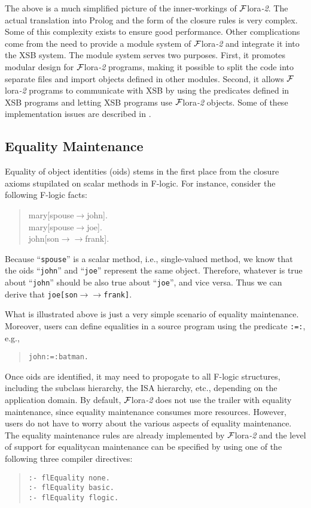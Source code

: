 \documentclass[11pt]{article}
\newcommand{\fd}{\ensuremath{{\rightarrow}}}                   %
\newcommand{\mvd}{\ensuremath{{\rightarrow\!\!\!\!\rightarrow}}}  %
\newcommand{\FLORA}{{\mbox{${\cal F}${\sc lora}\rm\emph{-2}}}\xspace}
\newcommand{\fl}{\mbox{F-logic}\xspace}
\begin{document}
The above is a much simplified picture of the inner-workings of \FLORA. The
actual translation into Prolog and the form of the closure rules is very
complex.  Some of this complexity exists to ensure good performance.  Other
complications come from the need to provide a module system of \FLORA and
integrate it into the XSB system.  The module system serves two purposes.
First, it promotes modular design for \FLORA programs, making it possible
to split the code into separate files and import objects defined in other
modules. Second, it allows \FLORA programs to communicate with XSB by using
the predicates defined in XSB programs and letting XSB programs use \FLORA
objects.  Some of these implementation issues are described in
\cite{guiz-flora-00}.


\subsection{Equality Maintenance}


Equality of object identities (oids) stems in the first place from the
closure axioms stupilated on scalar methods in \fl. For instance, consider
the following \fl facts:
\begin{quote}
mary[spouse{\fd}john]. \\
mary[spouse{\fd}joe]. \\
john[son{\mvd}frank].
\end{quote}
Because ``{\tt spouse}'' is a scalar method, i.e., single-valued method,
we know that the oids ``{\tt john}'' and ``{\tt joe}'' represent
the same object. Therefore, whatever is true about ``{\tt john}'' should
be also true about ``{\tt joe}'', and vice versa. Thus we can derive
that {\tt joe[son{\mvd}frank]}.

What is illustrated above is just a very simple scenario of equality
maintenance. Moreover, users can define equalities in a source program
using the predicate {\tt :=:}, e.g.,
\begin{quote}
\verb|john:=:batman.|
\end{quote}

Once oids are identified, it may need to propogate to all
\fl structures, including the subclass hierarchy, the ISA hierarchy, etc.,
depending on the application domain. By default, \FLORA does not use
the trailer with equality maintenance, since equality maintenance
consumes more resources.  However, users do not have to worry about
the various aspects of equality maintenance. The equality maintenance
rules are already implemented by \FLORA and the level of support for
equalitycan maintenance can be specified by using one of the following
three compiler directives:
\begin{quote}
\begin{verbatim}
:- flEquality none.
:- flEquality basic.
:- flEquality flogic.
\end{verbatim}
\end{quote}
\end{document}
